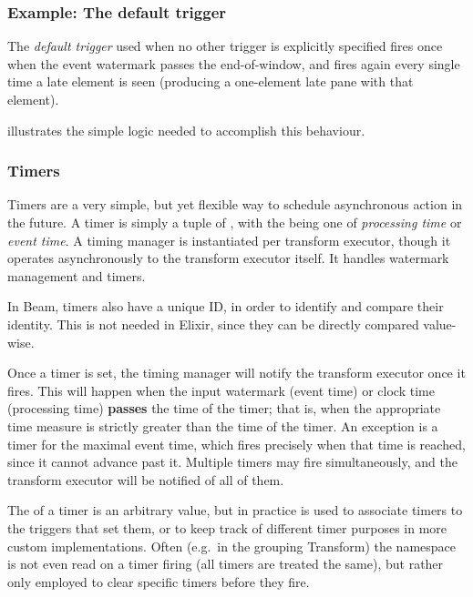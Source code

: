 \subsubsection{Example: The default trigger}

The \emph{default trigger} used when no other trigger is explicitly specified fires once when the event watermark passes the end-of-window, and fires again every single time a late element is seen (producing a one-element late pane with that element).

 illustrates the simple logic needed to accomplish this behaviour.


\subsubsection{Timers}

Timers are a very simple, but yet flexible way to schedule asynchronous action in the future.
A timer is simply a tuple of \footnotemark, with the  being one of \emph{processing time} or \emph{event time}.
A timing manager is instantiated per transform executor, though it operates asynchronously to the transform executor itself.
It handles watermark management and timers.

\footnotetext
{
In Beam, timers also have a unique ID, in order to identify and compare their identity. This is not needed in Elixir, since they can be directly compared value-wise.
}

Once a timer is set, the timing manager will notify the transform executor once it fires.
This will happen when the input watermark (event time) or clock time (processing time) \textbf{passes} the time of the timer; that is, when the appropriate time measure is strictly greater than the time of the timer.
An exception is a timer for the maximal event time, which fires precisely when that time is reached, since it cannot advance past it.
Multiple timers may fire simultaneously, and the transform executor will be notified of all of them.

The  of a timer is an arbitrary value, but in practice is used to associate timers to the triggers that set them, or to keep track of different timer purposes in more custom implementations.
Often (e.g.\ in the grouping Transform) the namespace is not even read on a timer firing (all timers are treated the same), but rather only employed to clear specific timers before they fire.

